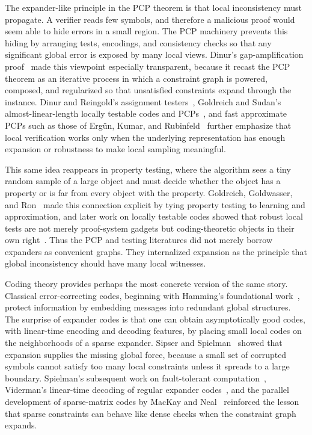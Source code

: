 The expander-like principle in the PCP theorem is that local inconsistency must propagate. A verifier reads few symbols, and therefore a malicious proof would seem able to hide errors in a small region. The PCP machinery prevents this hiding by arranging tests, encodings, and consistency checks so that any significant global error is exposed by many local views. Dinur's gap-amplification proof~\cite{Din2007} made this viewpoint especially transparent, because it recast the PCP theorem as an iterative process in which a constraint graph is powered, composed, and regularized so that unsatisfied constraints expand through the instance. Dinur and Reingold's assignment testers~\cite{DR2006}, Goldreich and Sudan's almost-linear-length locally testable codes and PCPs~\cite{GS2006}, and fast approximate PCPs such as those of Erg{\"u}n, Kumar, and Rubinfeld~\cite{EKR2004} further emphasize that local verification works only when the underlying representation has enough expansion or robustness to make local sampling meaningful.

This same idea reappears in property testing, where the algorithm sees a tiny random sample of a large object and must decide whether the object has a property or is far from every object with the property. Goldreich, Goldwasser, and Ron~\cite{GGR1998} made this connection explicit by tying property testing to learning and approximation, and later work on locally testable codes showed that robust local tests are not merely proof-system gadgets but coding-theoretic objects in their own right~\cite{GS2006,Gol2017}. Thus the PCP and testing literatures did not merely borrow expanders as convenient graphs. They internalized expansion as the principle that global inconsistency should have many local witnesses.

 Coding theory provides perhaps the most concrete version of the same story. Classical error-correcting codes, beginning with Hamming's foundational work~\cite{Ham1950}, protect information by embedding messages into redundant global structures. The surprise of expander codes is that one can obtain asymptotically good codes, with linear-time encoding and decoding features, by placing small local codes on the neighborhoods of a sparse expander. Sipser and Spielman~\cite{FOCS:SipSpi94} showed that expansion supplies the missing global force, because a small set of corrupted symbols cannot satisfy too many local constraints unless it spreads to a large boundary. Spielman's subsequent work on fault-tolerant computation~\cite{FOCS:Spielman96}, Viderman's linear-time decoding of regular expander codes~\cite{ITCS:Viderman12}, and the parallel development of sparse-matrix codes by MacKay and Neal~\cite{IMA:MacNea95} reinforced the lesson that sparse constraints can behave like dense checks when the constraint graph expands.

